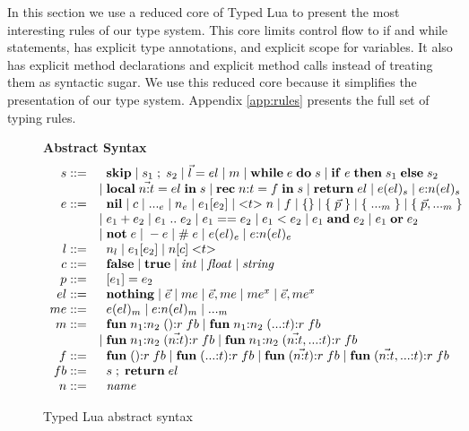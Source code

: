 In this section we use a reduced core of Typed Lua to present the
most interesting rules of our type system.
This core limits control flow to if and while statements,
has explicit type annotations, and explicit scope for variables.
It also has explicit method declarations and explicit method calls
instead of treating them as syntactic sugar.
We use this reduced core because it simplifies the presentation
of our type system.
Appendix \ref{app:rules} presents the full set of typing rules.

\begin{figure}[!ht]
\textbf{Abstract Syntax}\\
\dstart
$$
\begin{array}{rl}
s ::= & \;\; \mathbf{skip} \; | \;
s_{1} \; ; \; s_{2} \; | \;
\vec{l} = el \; | \;
m \; | \;
\mathbf{while} \; e \; \mathbf{do} \; s \; | \;
\mathbf{if} \; e \; \mathbf{then} \; s_{1} \; \mathbf{else} \; s_{2}\\
& | \; \mathbf{local} \; \vec{n{:}t} = el \; \mathbf{in} \; s \; | \;
\mathbf{rec} \; n{:}t = f \; \mathbf{in} \; s \; | \;
\mathbf{return} \; el \; | \;
e(el)_{s} \; | \;
e{:}n(el)_{s}\\
e ::= & \;\; \mathbf{nil} \; | \;
c \; | \;
{...}_{e} \; | \;
n_{e} \; | \;
e_{1}[e_{2}] \; | \;
{<}t{>} \; n \; | \;
f \; | \;
\{ \} \; | \;
\{ \; \vec{p} \; \} \; | \;
\{ \; {...}_{m} \; \} \; | \;
\{ \; \vec{p},{...}_{m} \; \}\\
& | \; e_{1} + e_{2} \; | \;
e_{1} \; {..} \; e_{2} \; | \;
e_{1} == e_{2} \; | \;
e_{1} < e_{2} \; | \;
e_{1} \; \mathbf{and} \; e_{2} \; | \;
e_{1} \; \mathbf{or} \; e_{2} \\
& | \; \mathbf{not} \; e \; | \;
- e \; | \;
\# \; e \; | \;
e(el)_{e} \; | \;
e{:}n(el)_{e}\\
l ::= & \;\; n_{l} \; | \;
e_{1}[e_{2}] \; | \;
n[c] \; {<}t{>}\\
c ::= & \;\; \mathbf{false} \; | \;
\mathbf{true} \; | \;
{\it int} \; | \;
{\it float} \; | \;
{\it string}\\
p ::= & \;\; [e_{1}] = e_{2}\\
el ::= & \;\; \mathbf{nothing} \; | \;
\vec{e} \; | \;
me \; | \;
\vec{e}, me \; | \;
me^{x} \; | \;
\vec{e}, me^{x}\\
me ::= & \;\; e(el)_{m} \; | \;
e{:}n(el)_{m} \; | \;
{...}_{m}\\
m ::= & \;\; \mathbf{fun} \; n_{1}{:}n_{2} \; (){:}r \; fb \; | \;
\mathbf{fun} \; n_{1}{:}n_{2} \; ({...}{:}t){:}r \; fb\\
& | \; \mathbf{fun} \; n_{1}{:}n_{2} \; (\vec{n{:}t}){:}r \; fb \; | \;
\mathbf{fun} \; n_{1}{:}n_{2} \; (\vec{n{:}t},{...}{:}t){:}r \; fb\\
f ::= & \;\; \mathbf{fun} \; (){:}r \; fb \; | \;
\mathbf{fun} \; ({...}{:}t){:}r \; fb \; | \;
\mathbf{fun} \; (\vec{n{:}t}){:}r \; fb \; | \;
\mathbf{fun} \; (\vec{n{:}t},{...}{:}t){:}r \; fb\\
fb ::= & \;\; s \;;\; \mathbf{return} \; el\\
n ::= & \;\; {\it name}\\
\end{array}
$$
\dend
\caption{Typed Lua abstract syntax}
\label{fig:syntax}
\end{figure}

